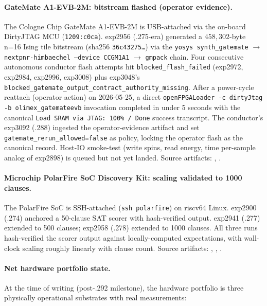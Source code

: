 \documentclass[10pt]{article}
\begin{document}
\paragraph{GateMate A1-EVB-2M: bitstream flashed (operator evidence).}
The Cologne Chip GateMate A1-EVB-2M is USB-attached via the on-board
DirtyJTAG MCU (\texttt{1209:c0ca}). exp2956 (.275-era) generated a
$458{,}302$-byte n=16 Ising tile bitstream
(sha256 \texttt{36c43275\ldots}) via the
\texttt{yosys synth\_gatemate} $\rightarrow$ \texttt{nextpnr-himbaechel
--device CCGM1A1} $\rightarrow$ \texttt{gmpack} chain. Four
consecutive autonomous conductor flash attempts hit
\texttt{blocked\_flash\_failed} (exp2972, exp2984, exp2996, exp3008)
plus exp3048's \texttt{blocked\_gatemate\_output\_contract\_authority\_missing}.
After a power-cycle reattach (operator action) on 2026-05-25, a
direct \texttt{openFPGALoader -c dirtyJtag -b olimex\_gatemateevb}
invocation completed in under 5 seconds with the canonical
\texttt{Load SRAM via JTAG: 100\%~/~Done} success transcript. The
conductor's exp3092 (.288) ingested the operator-evidence artifact
and set \texttt{gatemate\_rerun\_allowed=false} as policy, locking
the operator flash as the canonical record. Host-IO smoke-test
(write spins, read energy, time per-sample analog of exp2898) is
queued but not yet landed. Source artifacts:
,
.

\paragraph{Microchip PolarFire SoC Discovery Kit: scaling validated to 1000 clauses.}
The PolarFire SoC is SSH-attached (\texttt{ssh polarfire}) on
riscv64 Linux. exp2900 (.274) anchored a 50-clause SAT scorer
with hash-verified output. exp2941 (.277) extended to 500 clauses;
exp2958 (.278) extended to 1000 clauses. All three runs
hash-verified the scorer output against locally-computed
expectations, with wall-clock scaling roughly linearly with
clause count. Source artifacts:
,
,
.

\paragraph{Net hardware portfolio state.}
At the time of writing (post-.292 milestone), the hardware portfolio
is three physically operational substrates with real measurements:
\end{document}
